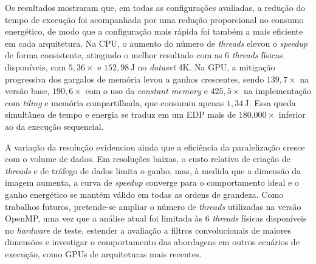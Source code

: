 \documentclass[12pt]{article}
\begin{document}
Os resultados mostraram que, em todas as configurações avaliadas, a redução do tempo de execução foi acompanhada por uma redução proporcional no consumo energético, de modo que a configuração mais rápida foi também a mais eficiente em cada arquitetura. Na CPU, o aumento do número de \textit{threads} elevou o \textit{speedup} de forma consistente, atingindo o melhor resultado com as 6 \textit{threads} físicas disponíveis, com $5{,}36\times$ e $152{,}98$\,J no \textit{dataset} 4K. Na GPU, a mitigação progressiva dos gargalos de memória levou a ganhos crescentes, sendo $139{,}7\times$ na versão base, $190{,}6\times$ com o uso da \textit{constant memory} e $425{,}5\times$ na implementação com \textit{tiling} e memória compartilhada, que consumiu apenas $1{,}34$\,J. Essa queda simultânea de tempo e energia se traduz em um EDP mais de $180.000\times$ inferior ao da execução sequencial.

A variação da resolução evidenciou ainda que a eficiência da paralelização cresce com o volume de dados. Em resoluções baixas, o custo relativo de criação de \textit{threads} e de tráfego de dados limita o ganho, mas, à medida que a dimensão da imagem aumenta, a curva de \textit{speedup} converge para o comportamento ideal e o ganho energético se mantém válido em todas as ordens de grandeza. Como trabalhos futuros, pretende-se ampliar o número de \textit{threads} utilizadas na versão OpenMP, uma vez que a análise atual foi limitada às 6 \textit{threads} físicas disponíveis no \textit{hardware} de teste, estender a avaliação a filtros convolucionais de maiores dimensões e investigar o comportamento das abordagens em outros cenários de execução, como GPUs de arquiteturas mais recentes.






\end{document}
